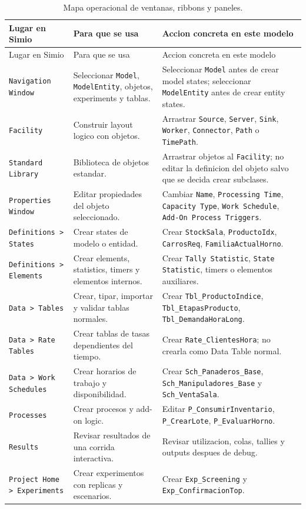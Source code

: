 \documentclass[11pt]{article}
\newcommand{\simio}[1]{\texttt{#1}}
\newcommand{\tabla}[1]{\texttt{#1}}
\newcommand{\state}[1]{\texttt{#1}}
\newcommand{\proc}[1]{\texttt{#1}}
\begin{document}
{\scriptsize
\begin{longtable}{L{3.3cm}L{4.1cm}L{6.2cm}}
\caption{Mapa operacional de ventanas, ribbons y paneles.}\\
\toprule
{}
\color{white}Lugar en Simio & \color{white}Para que se usa & \color{white}Accion concreta en este modelo \\
\midrule
\endfirsthead
\toprule
{}
\color{white}Lugar en Simio & \color{white}Para que se usa & \color{white}Accion concreta en este modelo \\
\midrule
\endhead
\simio{Navigation Window} & Seleccionar \simio{Model}, \simio{ModelEntity}, objetos, experiments y tablas. & Seleccionar \simio{Model} antes de crear model states; seleccionar \simio{ModelEntity} antes de crear entity states. \\
\simio{Facility} & Construir layout logico con objetos. & Arrastrar \simio{Source}, \simio{Server}, \simio{Sink}, \simio{Worker}, \simio{Connector}, \simio{Path} o \simio{TimePath}. \\
\simio{Standard Library} & Biblioteca de objetos estandar. & Arrastrar objetos al \simio{Facility}; no editar la definicion del objeto salvo que se decida crear subclases. \\
\simio{Properties Window} & Editar propiedades del objeto seleccionado. & Cambiar \simio{Name}, \simio{Processing Time}, \simio{Capacity Type}, \simio{Work Schedule}, \simio{Add-On Process Triggers}. \\
\simio{Definitions > States} & Crear states de modelo o entidad. & Crear \state{StockSala}, \state{ProductoIdx}, \state{CarrosReq}, \state{FamiliaActualHorno}. \\
\simio{Definitions > Elements} & Crear elements, statistics, timers y elementos internos. & Crear \simio{Tally Statistic}, \simio{State Statistic}, timers o elementos auxiliares. \\
\simio{Data > Tables} & Crear, tipar, importar y validar tablas normales. & Crear \tabla{Tbl\_ProductoIndice}, \tabla{Tbl\_EtapasProducto}, \tabla{Tbl\_DemandaHoraLong}. \\
\simio{Data > Rate Tables} & Crear tablas de tasas dependientes del tiempo. & Crear \tabla{Rate\_ClientesHora}; no crearla como Data Table normal. \\
\simio{Data > Work Schedules} & Crear horarios de trabajo y disponibilidad. & Crear \simio{Sch\_Panaderos\_Base}, \simio{Sch\_Manipuladores\_Base} y \simio{Sch\_VentaSala}. \\
\simio{Processes} & Crear procesos y add-on logic. & Editar \proc{P\_ConsumirInventario}, \proc{P\_CrearLote}, \proc{P\_EvaluarHorno}. \\
\simio{Results} & Revisar resultados de una corrida interactiva. & Revisar utilizacion, colas, tallies y outputs despues de debug. \\
\simio{Project Home > Experiments} & Crear experimentos con replicas y escenarios. & Crear \simio{Exp\_Screening} y \simio{Exp\_ConfirmacionTop}. \\
\bottomrule
\end{longtable}
}
\end{document}
